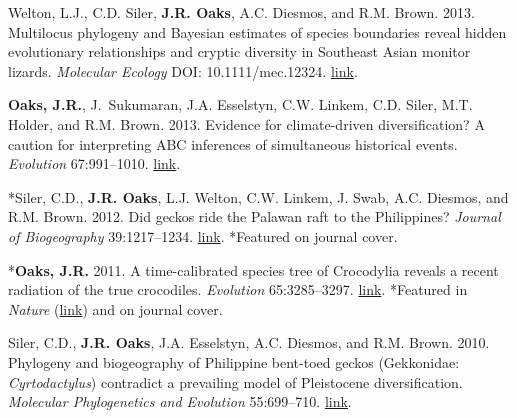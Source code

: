 \documentclass[10pt]{article}
\begin{document}
% 
\begin{thebibliography}{8}
\providecommand{\natexlab}[1]{#1}
\providecommand{\url}[1]{\texttt{#1}}
\providecommand{\urlprefix}{URL }

  Welton, L.J., C.D. Siler, {\bf J.R. Oaks}, A.C. Diesmos, and R.M. Brown.
  2013.
\newblock Multilocus phylogeny and {B}ayesian estimates of species boundaries
  reveal hidden evolutionary relationships and cryptic diversity in {S}outheast
  {A}sian monitor lizards.
\newblock \emph{Molecular Ecology} DOI: 10.1111/mec.12324.
\newblock
  \href{http://onlinelibrary.wiley.com/doi/10.1111/mec.12324/abstract}{link}.

{\bf Oaks, J.R.}, J.~Sukumaran, J.A. Esselstyn, C.W. Linkem, C.D. Siler, M.T.
  Holder, and R.M. Brown. 2013.
\newblock Evidence for climate-driven diversification? A caution for
  interpreting {ABC} inferences of simultaneous historical events.
\newblock \emph{Evolution} 67:991--1010.
\newblock
  \href{http://onlinelibrary.wiley.com/doi/10.1111/j.1558-5646.2012.01840.x/abstract}{link}.

*Siler, C.D., {\bf J.R. Oaks}, L.J. Welton, C.W. Linkem, J. Swab, A.C. Diesmos,
  and R.M. Brown. 2012.
\newblock Did geckos ride the {P}alawan raft to the {P}hilippines?
\newblock \emph{Journal of Biogeography} 39:1217--1234.
\newblock
  \href{http://onlinelibrary.wiley.com/doi/10.1111/j.1365-2699.2011.02680.x/abstract}{link}.
  *Featured on journal cover.

*{\bf Oaks, J.R.} 2011.
\newblock A time-calibrated species tree of {C}rocodylia reveals a recent
  radiation of the true crocodiles.
\newblock \emph{Evolution} 65:3285--3297.
\newblock
  \href{http://onlinelibrary.wiley.com/doi/10.1111/j.1558-5646.2011.01373.x/abstract}{link}.
  *Featured in \emph{Nature}
  (\href{http://www.nature.com/nature/journal/v474/n7353/full/474545a.html}{link})
  and on journal cover.

Siler, C.D., {\bf J.R. Oaks}, J.A. Esselstyn, A.C. Diesmos, and R.M. Brown.
  2010.
\newblock Phylogeny and biogeography of {P}hilippine bent-toed geckos
  ({G}ekkonidae: \emph{{C}yrtodactylus}) contradict a prevailing model of
  {P}leistocene diversification.
\newblock \emph{Molecular Phylogenetics and Evolution} 55:699--710.
\newblock
  \href{http://www.sciencedirect.com/science/article/pii/S1055790310000382}{link}.


\end{thebibliography}
\end{document}
